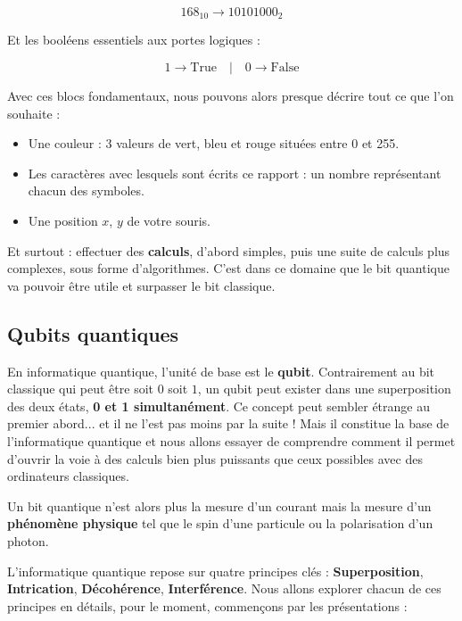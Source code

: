 \documentclass{article}
\begin{document}
\[ 168_{10} \rightarrow 10101000_2 \]

Et les booléens essentiels aux portes logiques :

\[ 1 \rightarrow \text{True} \quad | \quad 0 \rightarrow \text{False} \]

Avec ces blocs fondamentaux, nous pouvons alors presque décrire tout ce que l’on souhaite :
\medskip
\begin{itemize}
    \item Une couleur : 3 valeurs de vert, bleu et rouge situées entre 0 et 255.
    \item Les caractères avec lesquels sont écrits ce rapport : un nombre représentant chacun des symboles.
    \item Une position $x$, $y$ de votre souris.
\end{itemize}
\medskip
Et surtout : effectuer des \textbf{calculs}, d’abord simples, puis une suite de calculs plus complexes, sous forme d’algorithmes. C’est dans ce domaine que le bit quantique va pouvoir être utile et surpasser le bit classique.

\subsection{Qubits quantiques}

En informatique quantique, l’unité de base est le \textbf{qubit}. Contrairement au bit classique qui peut être soit $0$ soit $1$, un qubit peut exister dans une superposition des deux états, \textbf{0 et 1 simultanément}. \cite{wikiQubit2025} Ce concept peut sembler étrange au premier abord... et il ne l’est pas moins par la suite ! Mais il constitue la base de l'informatique quantique et nous allons essayer de comprendre comment il permet d'ouvrir la voie à des calculs bien plus puissants que ceux possibles avec des ordinateurs classiques.

Un bit quantique n’est alors plus la mesure d’un courant mais la mesure d’un \textbf{phénomène physique} tel que le spin d'une particule ou la polarisation d'un photon.

L’informatique quantique repose sur quatre principes clés : \textbf{Superposition}, \textbf{Intrication}, \textbf{Décohérence}, \textbf{Interférence}. \cite{ibmQuantum2024}
\medskip
Nous allons explorer chacun de ces principes en détails, pour le moment, commençons par les présentations :
\end{document}

